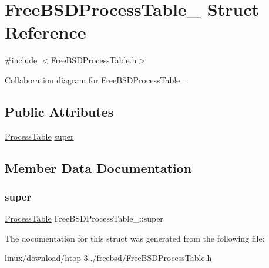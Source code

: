 \hypertarget{structFreeBSDProcessTable__}{}\section{Free\+B\+S\+D\+Process\+Table\+\_\+ Struct Reference}
\label{structFreeBSDProcessTable__}


{\ttfamily \#include $<$Free\+B\+S\+D\+Process\+Table.\+h$>$}



Collaboration diagram for Free\+B\+S\+D\+Process\+Table\+\_\+\+:
\subsection*{Public Attributes}
\begin{DoxyCompactItemize}
\item 
\hyperlink{ProcessTable_8h_a54ec62da6f9d80d4d06e3845a2597a80}{Process\+Table} \hyperlink{structFreeBSDProcessTable___a8c15bdc99fa33967f47fe9a2e9224612}{super}
\end{DoxyCompactItemize}


\subsection{Member Data Documentation}
\mbox{\label{structFreeBSDProcessTable___a8c15bdc99fa33967f47fe9a2e9224612}} 
\subsubsection{\texorpdfstring{super}{super}}
{\footnotesize\ttfamily \hyperlink{ProcessTable_8h_a54ec62da6f9d80d4d06e3845a2597a80}{Process\+Table} Free\+B\+S\+D\+Process\+Table\+\_\+\+::super}



The documentation for this struct was generated from the following file\+:\begin{DoxyCompactItemize}
\item 
linux/download/htop-\/3../freebsd/\hyperlink{FreeBSDProcessTable_8h}{Free\+B\+S\+D\+Process\+Table.\+h}\end{DoxyCompactItemize}
